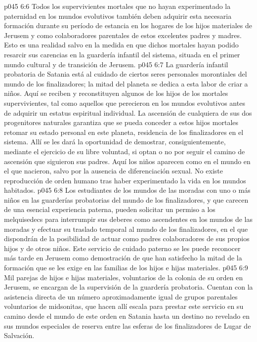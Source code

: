 \vs p045 6:6 Todos los supervivientes mortales que no hayan experimentado la paternidad en los mundos evolutivos también deben adquirir esta necesaria formación durante su período de estancia en los hogares de los hijos materiales de Jerusem y como colaboradores parentales de estos excelentes padres y madres. Esto es una realidad salvo en la medida en que dichos mortales hayan podido resarcir sus carencias en la guardería infantil del sistema, situada en el primer mundo cultural y de transición de Jerusem.
\vs p045 6:7 \pc La guardería infantil probatoria de Satania está al cuidado de ciertos seres personales morontiales del mundo de los finalizadores; la mitad del planeta se dedica a esta labor de criar a niños. Aquí se reciben y reconstituyen algunos de los hijos de los mortales supervivientes, tal como aquellos que perecieron en los mundos evolutivos antes de adquirir un estatus espiritual individual. La ascensión de cualquiera de sus dos progenitores naturales garantiza que se pueda conceder a estos hijos mortales retomar su estado personal en este planeta, residencia de los finalizadores en el sistema. Allí se les dará la oportunidad de demostrar, consiguientemente, mediante el ejercicio de su libre voluntad, si optan o no por seguir el camino de ascensión que siguieron sus padres. Aquí los niños aparecen como en el mundo en el que nacieron, salvo por la ausencia de diferenciación sexual. No existe reproducción de orden humano tras haber experimentado la vida en los mundos habitados.
\vs p045 6:8 Los estudiantes de los mundos de las moradas con uno o más niños en las guarderías probatorias del mundo de los finalizadores, y que carecen de una esencial experiencia paterna, pueden solicitar un permiso a los melquisedecs para interrumpir sus deberes como ascendentes en los mundos de las moradas y efectuar su traslado temporal al mundo de los finalizadores, en el que dispondrán de la posibilidad de actuar como padres colaboradores de sus propios hijos y de otros niños. Este servicio de cuidado paterno se les puede reconocer más tarde en Jerusem como demostración de que han satisfecho la mitad de la formación que se les exige en las familias de los hijos e hijas materiales.
\vs p045 6:9 Mil parejas de hijos e hijas materiales, voluntarios de la colonia de su orden en Jerusem, se encargan de la supervisión de la guardería probatoria. Cuentan con la asistencia directa de un número aproximadamente igual de grupos parentales voluntarios de midsonitas, que hacen allí escala para prestar este servicio en su camino desde el mundo de este orden en Satania hasta un destino no revelado en sus mundos especiales de reserva entre las esferas de los finalizadores de Lugar de Salvación.
